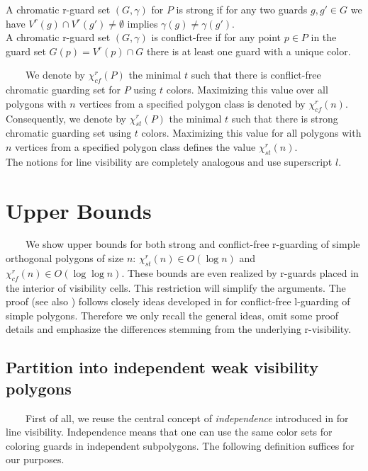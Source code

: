 \documentclass[a4paper,USenglish,numberwithinsect]{lipics}
\theoremstyle{plain}
\begin{document}
\begin{definition} A chromatic r-guard set $(G,\gamma)$ for $P$ is  strong
 if for any two  guards $g,g'\in G$ we have
$V^r(g)\cap V^r(g')\not =\emptyset$ implies $\gamma(g)\not =\gamma(g')$.\\
 A chromatic r-guard set $(G,\gamma)$  is  conflict-free   if for any
point $p\in P$ in the guard set $G(p)=V^r(p)\cap  G$ there is at least one
guard with a unique color. 
\end{definition}
\ \ \ \ We denote by $\chi^r_{cf}(P)$ the minimal $t$ such that there is
conflict-free chromatic guarding set for $P$ using $t$ colors. Maximizing this value
over  all polygons with $n$ vertices from  a specified polygon class is
denoted by $\chi^r_{cf}(n)$.\\
Consequently, we  denote by $\chi^r_{st}(P)$ the minimal $t$ such that there is
strong chromatic guarding set using $t$ colors. Maximizing this value
for all polygons with $n$ vertices from  a specified polygon class defines
the value  $\chi^r_{st}(n)$.\\
The notions for line visibility are completely analogous and use superscript $l$.


\section{Upper Bounds }
\ \ \ \ We show  upper bounds for both strong and conflict-free r-guarding of
simple orthogonal polygons of size $n$: $\chi_{st}^r(n)\in O(\log n)$ and 
$\chi_{cf}^r(n)\in O(\log\log n)$. These bounds are even  realized by r-guards
placed in the interior of visibility cells. This restriction will
simplify the arguments.  The proof (see also \cite{Wi}) follows closely ideas
developed in \cite{B_etal, BS} for conflict-free
l-guarding of simple  polygons. Therefore we only recall the
general ideas, omit some proof details and emphasize the differences
stemming from the underlying r-visibility. 
 







\subsection{Partition into independent weak visibility polygons}
\ \ \ \ First of all, we reuse the central concept of {\it independence} introduced
in \cite{BS, B_etal} for line
visibility. Independence means that one can use the same color sets for
coloring guards in independent subpolygons.
 The following definition  suffices for our purposes.
\end{document}

